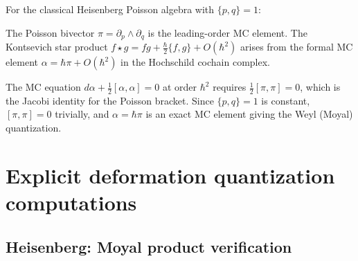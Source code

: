 \begin{computation}\label{comp:mc-coords}
For the classical Heisenberg Poisson algebra with $\{p, q\} = 1$:

The Poisson bivector $\pi = \partial_p \wedge \partial_q$ is the leading-order MC element.  The Kontsevich star product $f \star g = fg + \frac{\hbar}{2}\{f,g\} + O(\hbar^2)$ arises from the formal MC element $\alpha = \hbar\pi + O(\hbar^2)$ in the Hochschild cochain complex.

The MC equation $d\alpha + \frac{1}{2}[\alpha, \alpha] = 0$ at order $\hbar^2$ requires $\frac{1}{2}[\pi, \pi] = 0$, which is the Jacobi identity for the Poisson bracket. Since $\{p,q\} = 1$ is constant, $[\pi,\pi] = 0$ trivially, and $\alpha = \hbar\pi$ is an exact MC element giving the Weyl (Moyal) quantization.
\end{computation}


\section{Explicit deformation quantization computations}
\label{sec:explicit-dq-computations}

\subsection{Heisenberg: Moyal product verification}

